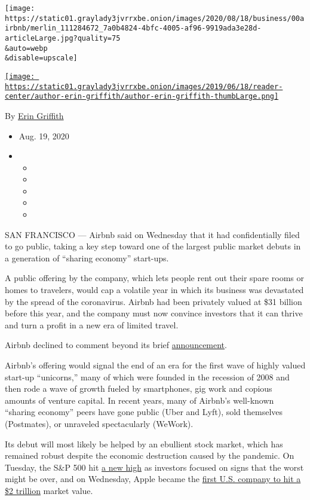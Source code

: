 \texttt{[image: https://static01.graylady3jvrrxbe.onion/images/2020/08/18/business/00airbnb/merlin\_111284672\_7a0b4824-4bfc-4005-af96-9919ada3e28d-articleLarge.jpg?quality=75\\\&auto=webp\\\&disable=upscale]}

\href{https://www.nytimes3xbfgragh.onion/by/erin-griffith}{\texttt{[image: https://static01.graylady3jvrrxbe.onion/images/2019/06/18/reader-center/author-erin-griffith/author-erin-griffith-thumbLarge.png]}}

By \href{https://www.nytimes3xbfgragh.onion/by/erin-griffith}{Erin
Griffith}

\begin{itemize}
\item
  Aug. 19, 2020
\item
  \begin{itemize}
  \item
  \item
  \item
  \item
  \item
  \end{itemize}
\end{itemize}

SAN FRANCISCO --- Airbnb said on Wednesday that it had confidentially
filed to go public, taking a key step toward one of the largest public
market debuts in a generation of ``sharing economy'' start-ups.

A public offering by the company, which lets people rent out their spare
rooms or homes to travelers, would cap a volatile year in which its
business was devastated by the spread of the coronavirus. Airbnb had
been privately valued at \$31 billion before this year, and the company
must now convince investors that it can thrive and turn a profit in a
new era of limited travel.

Airbnb declined to comment beyond its brief
\href{https://news.airbnb.com/airbnb-announces-confidential-submission-of-draft-registration-statement/}{announcement}.

Airbnb's offering would signal the end of an era for the first wave of
highly valued start-up ``unicorns,'' many of which were founded in the
recession of 2008 and then rode a wave of growth fueled by smartphones,
gig work and copious amounts of venture capital. In recent years, many
of Airbnb's well-known ``sharing economy'' peers have gone public (Uber
and Lyft), sold themselves (Postmates), or unraveled spectacularly
(WeWork).

Its debut will most likely be helped by an ebullient stock market, which
has remained robust despite the economic destruction caused by the
pandemic. On Tuesday, the S\&P 500 hit
\href{https://www.nytimes3xbfgragh.onion/2020/08/18/business/stock-market-record.html?action=click\&module=Top\%20Stories\&pgtype=Homepage}{a
new high} as investors focused on signs that the worst might be over,
and on Wednesday, Apple became the
\href{https://www.nytimes3xbfgragh.onion/2020/08/19/technology/apple-2-trillion.html?action=click\&module=Top\%20Stories\&pgtype=Homepage}{first
U.S. company to hit a \$2 trillion} market value.

